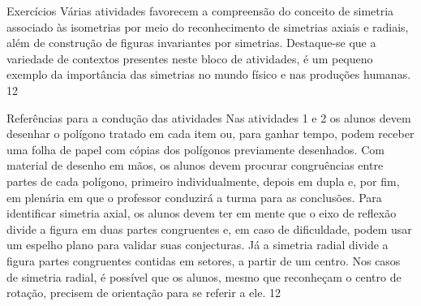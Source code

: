 \clearpage
\def\currentcolor{cor1}

\marginpar{\vspace{-1em}}
\begin{objectives}{Exercícios}
{
 Várias atividades favorecem a compreensão do conceito de simetria associado às isometrias por meio do reconhecimento de simetrias axiais e radiais, além de construção de figuras invariantes por simetrias. Destaque-se que a variedade de contextos presentes neste bloco de atividades, é um pequeno exemplo da importância das simetrias no mundo físico e nas produções humanas.
}{1}{2}
\end{objectives}
\marginpar{\vspace{-2.5em}}
\begin{sugestions}{Referências para a condução das atividades}
{
Nas atividades 1 e 2 os alunos devem desenhar o polígono tratado em cada item ou, para ganhar tempo, podem receber uma folha de papel com cópias dos polígonos previamente desenhados. Com material de desenho em mãos, os alunos devem procurar congruências entre partes de cada polígono, primeiro individualmente, depois em dupla e, por fim, em plenária em que o professor conduzirá a turma para as conclusões. Para identificar simetria axial, os alunos devem ter em mente que o eixo de reflexão divide a figura em duas partes congruentes e, em caso de dificuldade, podem usar um espelho plano para validar suas conjecturas. Já a simetria radial divide a figura partes congruentes contidas em setores, a partir de um centro.  Nos casos de simetria radial, é possível que os alunos, mesmo que reconheçam o centro de rotação, precisem de orientação para se referir a ele. 
}{1}{2}
\end{sugestions}
\marginpar{\vspace{-1em}}
